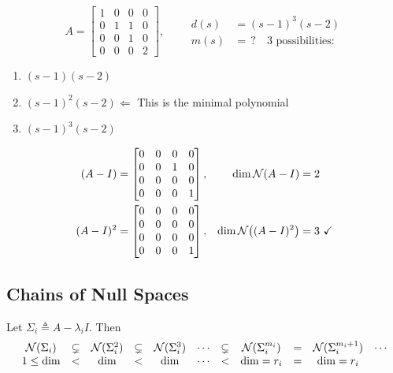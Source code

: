 \begin{example}
\[
A=\left[\begin{array}{ccc|c}1&0&0&0\\0&1&1&0\\0&0&1&0\\\hline 0&0&0&2\end{array}\right],
\qquad
\begin{aligned}
d(s)&=(s-1)^3(s-2)\\
m(s)&=\,?\quad\text{3 possibilities:}
\end{aligned}
\]
\begin{enumerate}[label=\arabic*),itemsep=2pt,topsep=2pt]
\item $(s-1)(s-2)$
\item $(s-1)^2(s-2)$\quad $\Leftarrow$ This is the minimal polynomial
\item $(s-1)^3(s-2)$
\end{enumerate}
\begin{align*}
(A-I)&=\begin{bmatrix}0&0&0&0\\0&0&1&0\\0&0&0&0\\0&0&0&1\end{bmatrix}, & \dim\mathcal{N}(A-I)&=2\\
(A-I)^2&=\begin{bmatrix}0&0&0&0\\0&0&0&0\\0&0&0&0\\0&0&0&1\end{bmatrix}, & \dim\mathcal{N}\big((A-I)^2\big)&=3\ \checkmark
\end{align*}
\end{example}

\subsection{Chains of Null Spaces}\label{ss:nullspace-chains}
%
\point Let $\Sigma_i \triangleq A-\lambda_iI$. Then
\[
\begin{array}{ccccccccccc}
\mathcal{N}(\Sigma_i) & \subsetneq & \mathcal{N}(\Sigma_i^2) & \subsetneq & \mathcal{N}(\Sigma_i^3) & \cdots & \subsetneq & \mathcal{N}(\Sigma_i^{m_i}) & = & \mathcal{N}(\Sigma_i^{m_i+1}) & \cdots\\
1\le\dim & < & \dim & < & \dim & \cdots & < & \dim=r_i & = & \dim=r_i &
\end{array}
\]


